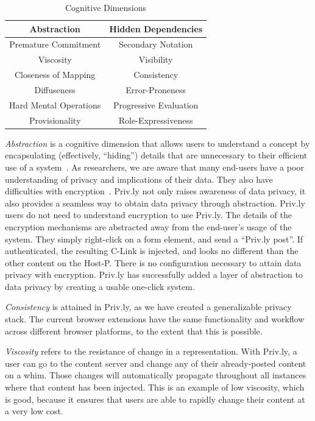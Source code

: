 \documentclass[letterpaper,twocolumn,10pt]{article}
\begin{document}
\begin{table}
\centering
\begin{tabular} {  c | c }
Abstraction & Hidden Dependencies \\ \hline
Premature Commitment & Secondary Notation \\ \hline
Viscosity & Visibility \\ \hline
Closeness of Mapping & Consistency \\ \hline
Diffuseness & Error-Proneness \\ \hline
Hard Mental Operations & Progressive Evaluation \\ \hline
Provisionality & Role-Expressiveness \\ \hline
\end{tabular}
\caption{Cognitive Dimensions}
\label{table_cd}
\end{table}

\emph{Abstraction} is a cognitive dimension that allows users to understand a concept by 
encapsulating (effectively, ``hiding'') details that are unnecessary to their 
efficient use of a system~\cite{green_1996}. As researchers, we are aware that 
many end-users have a poor understanding of privacy and implications of their 
data. They also have difficulties with encryption~\cite{Fahl2012,Whitten1999}. 
Priv.ly not only raises awareness of data privacy, it also provides a seamless way 
to obtain data privacy through abstraction. Priv.ly users do not need to understand 
encryption to use Priv.ly. The details of the encryption mechanisms are abstracted 
away from the end-user's usage of the system. They simply right-click on a form 
element, and send a ``Priv.ly post''. If authenticated, the resulting C-Link is 
injected, and looks no different than the other content on the Host-P. There is no 
configuration necessary to attain data privacy with encryption. Priv.ly has 
successfully added a layer of abstraction to data privacy by creating a usable 
one-click system. 

\emph{Consistency} is attained in Priv.ly, as we have created a generalizable privacy 
stack. The current browser extensions have the same functionality and workflow 
across different browser platforms, to the extent that this is possible.

\emph{Viscosity} refers to the resistance of change in a representation. With Priv.ly, a 
user can go to the content server and change any of their already-posted content 
on a whim. Those changes will automatically propagate throughout all instances 
where that content has been injected. This is an example of low viscosity, which 
is good, because it ensures that users are able to rapidly change their content at a 
very low cost. 
\end{document}
